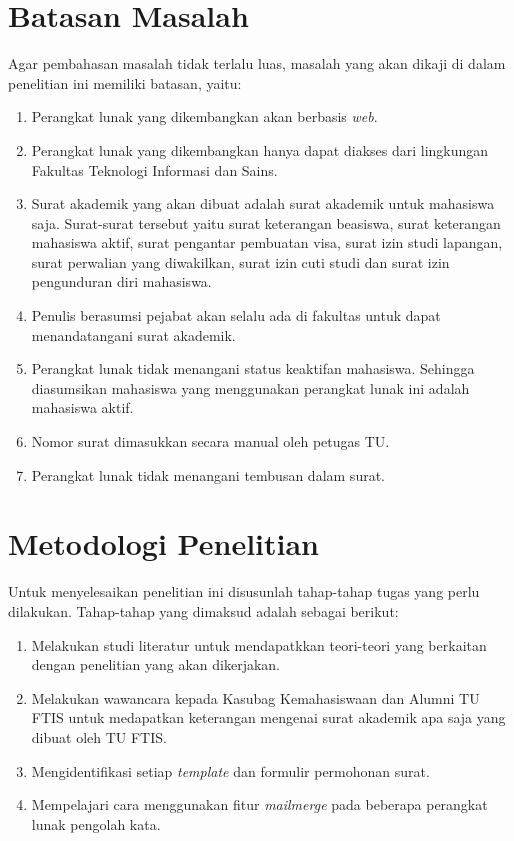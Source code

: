 \section{Batasan Masalah}
\label{sec:batasan_masalah}
Agar pembahasan masalah tidak terlalu luas, masalah yang akan dikaji di dalam penelitian ini memiliki batasan, yaitu:
\begin{enumerate}
	\item Perangkat lunak yang dikembangkan akan berbasis \textit{web}.
	\item Perangkat lunak yang dikembangkan hanya dapat diakses dari lingkungan Fakultas Teknologi Informasi dan Sains.
	\item Surat akademik yang akan dibuat adalah surat akademik untuk mahasiswa saja. Surat-surat tersebut yaitu surat keterangan beasiswa, surat keterangan mahasiswa aktif, surat pengantar pembuatan visa, surat izin studi lapangan, surat perwalian yang diwakilkan, surat izin cuti studi dan surat izin pengunduran diri mahasiswa.
	\item Penulis berasumsi pejabat akan selalu ada di fakultas untuk dapat menandatangani surat akademik.
	\item Perangkat lunak tidak menangani status keaktifan mahasiswa. Sehingga diasumsikan mahasiswa yang menggunakan perangkat lunak ini adalah mahasiswa aktif.
	\item Nomor surat dimasukkan secara manual oleh petugas TU.
	\item Perangkat lunak tidak menangani tembusan dalam surat.
\end{enumerate}

\section{Metodologi Penelitian}
\label{sec:metodologi_penelitian}
Untuk menyelesaikan penelitian ini disusunlah tahap-tahap tugas yang perlu dilakukan. Tahap-tahap yang dimaksud adalah sebagai berikut:
\begin{enumerate}
	\item Melakukan studi literatur untuk mendapatkkan teori-teori yang berkaitan dengan penelitian yang akan dikerjakan.
	\item Melakukan wawancara kepada Kasubag Kemahasiswaan dan Alumni TU FTIS untuk medapatkan keterangan mengenai surat akademik apa saja yang dibuat oleh TU FTIS.
	\item Mengidentifikasi setiap \textit{template} dan formulir permohonan surat.
	\item Mempelajari cara menggunakan fitur \textit{mailmerge} pada beberapa perangkat lunak pengolah kata.
\end{enumerate}

